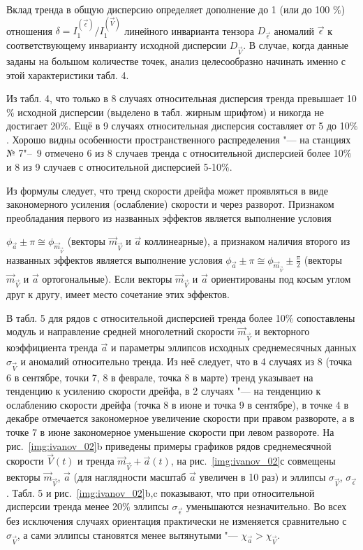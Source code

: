 Вклад тренда в общую дисперсию определяет дополнение до 1 (или до 100 $\%$) отношения $\delta={I^{(\vec{\epsilon})}_1}/I^{(\vec{V})}_1$ линейного инварианта тензора $D_{\vec{\epsilon}}$ аномалий $\vec{\epsilon}$ к соответствующему инварианту исходной дисперсии $D_{\vec{V}}$. В случае, когда данные заданы на большом количестве точек, анализ целесообразно начинать именно с этой характеристики табл. 4. 
  

Из табл. 4, что только в 8 случаях относительная дисперсия тренда превышает 10$\%$ исходной дисперсии (выделено в табл. жирным шрифтом) и никогда не достигает 20$\%$. Ещё в 9 случаях относительная дисперсия составляет от 5 до 10$\%$. Хорошо видны особенности пространственного распределения "--- на станциях № 7"--~9 отмечено 6 из 8 случаев тренда с относительной дисперсией более 10$\%$ и 8 из 9 случаев с относительной дисперсией 5-10$\%$.

Из формулы  следует, что тренд скорости дрейфа может проявляться в виде закономерного усиления (ослабление) скорости и через разворот. Признаком преобладания первого из названных эффектов является выполнение условия

$\phi_{\vec{a}}\pm\pi\cong\phi_{{\vec{m}_{\vec{V}}}}$ (векторы $\vec{m}_{\vec{V}}$ и $\vec{a}$ коллинеарные), а признаком наличия второго из названных эффектов является выполнение условия $\phi_{\vec{a}}\pm\pi\cong\phi_{{\vec{m}_{\vec{V}}}}\pm\frac{\pi}{2}$ (векторы $\vec{m}_{\vec{V}}$ и $\vec{a}$ ортогональные). Если векторы $\vec{m}_{\vec{V}}$ и $\vec{a}$ ориентированы под косым углом друг к другу, имеет место сочетание этих эффектов.

В табл. 5 для рядов с относительной дисперсией тренда более 10$\%$ сопоставлены модуль и направление средней многолетний скорости $\vec{m}_{\vec{V}}$ и векторного коэффициента тренда $\vec{a}$ и параметры эллипсов исходных среднемесячных данных $\sigma_{\vec{V}}$ и аномалий относительно тренда. Из неё следует, что в 4 случаях из 8 (точка 6 в сентябре, точки 7, 8 в феврале, точка 8 в марте) тренд указывает на тенденцию к усилению скорости дрейфа, в 2 случаях "--- на тенденцию к ослаблению скорости дрейфа (точка 8 в июне и точка 9 в сентябре), в точке 4 в декабре отмечается закономерное увеличение скорости при правом развороте, а в точке 7 в июне закономерное уменьшение скорости при левом развороте. На рис.~\ref{img:ivanov_02}b приведены примеры графиков рядов среднемесячной скорости $\vec{V}(t)$ и тренда $\vec{m}_{\vec{V}}+{\vec{a}(t)}$, на рис.~\ref{img:ivanov_02}с совмещены векторы $\vec{m}_{\vec{V}}$, $\vec{a}$ (для наглядности масштаб $\vec{a}$ увеличен в 10 раз) и эллипсы  $\sigma_{\vec{V}}$,  $\sigma_{\vec{\epsilon}}$. Табл. 5 и рис.~\ref{img:ivanov_02}b,c показывают, что при относительной дисперсии тренда менее 20$\%$ эллипсы $\sigma_{\vec{\epsilon}}$ уменьшаются незначительно. Во всех без исключения случаях  ориентация практически не изменяется сравнительно с $\sigma_{\vec{V}}$,  а сами эллипсы становятся менее вытянутыми "--- $\chi_{\vec{a}}>\chi_{\vec{V}}$.  


